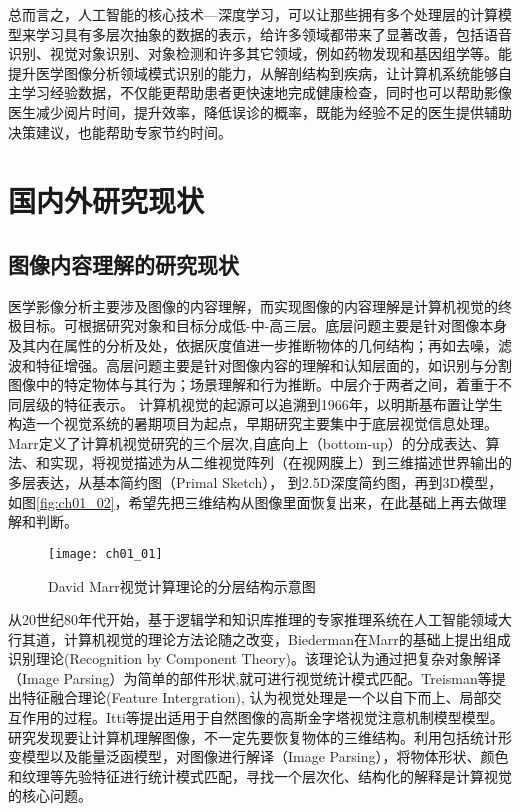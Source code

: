 总而言之，人工智能的核心技术—深度学习，可以让那些拥有多个处理层的计算模型来学习具有多层次抽象的数据的表示，给许多领域都带来了显著改善，包括语音识别、视觉对象识别、对象检测和许多其它领域，例如药物发现和基因组学等。能提升医学图像分析领域模式识别的能力，从解剖结构到疾病，让计算机系统能够自主学习经验数据，不仅能更帮助患者更快速地完成健康检查，同时也可以帮助影像医生减少阅片时间，提升效率，降低误诊的概率，既能为经验不足的医生提供辅助决策建议，也能帮助专家节约时间。       

\section{国内外研究现状}

\subsection{图像内容理解的研究现状}

医学影像分析主要涉及图像的内容理解，而实现图像的内容理解是计算机视觉的终极目标\cite{Cootes2004}。可根据研究对象和目标分成低-中-高三层。底层问题主要是针对图像本身及其内在属性的分析及处，依据灰度值进一步推断物体的几何结构；再如去噪，滤波和特征增强。高层问题主要是针对图像内容的理解和认知层面的，如识别与分割图像中的特定物体与其行为；场景理解和行为推断。中层介于两者之间，着重于不同层级的特征表示。
计算机视觉的起源可以追溯到1966年，以明斯基布置让学生构造一个视觉系统的暑期项目为起点，早期研究主要集中于底层视觉信息处理。
Marr\cite{Marr1982Vision}定义了计算机视觉研究的三个层次,自底向上（bottom-up）的分成表达、算法、和实现，将视觉描述为从二维视觉阵列（在视网膜上）到三维描述世界输出的多层表达，从基本简约图（Primal Sketch）， 到2.5D深度简约图，再到3D模型，如图\ref{fig:ch01_02}，希望先把三维结构从图像里面恢复出来，在此基础上再去做理解和判断。


\begin{figure}[!htbp]
    \centering
    \texttt{[image: ch01\_01]}
    \caption{David Marr视觉计算理论的分层结构示意图}
    \label{fig:ch01_01}
\end{figure}
    
从20世纪80年代开始，基于逻辑学和知识库推理的专家推理系统在人工智能领域大行其道，计算机视觉的理论方法论随之改变，Biederman在Marr的基础上提出组成识别理论(Recognition by Component Theory)。该理论认为通过把复杂对象解译（Image Parsing）为简单的部件形状,就可进行视觉统计模式匹配。Treisman等\cite{treisman1980a}提出特征融合理论(Feature Intergration), 认为视觉处理是一个以自下而上、局部交互作用的过程。Itti等\cite{Itti2005}提出适用于自然图像的高斯金字塔视觉注意机制模型模型。研究发现要让计算机理解图像，不一定先要恢复物体的三维结构。利用包括统计形变模型\cite{Cootes2004}以及能量泛函模型\cite{Kass1988}，对图像进行解译（Image Parsing），将物体形状、颜色和纹理等先验特征进行统计模式匹配，寻找一个层次化、结构化的解释是计算视觉的核心问题。

